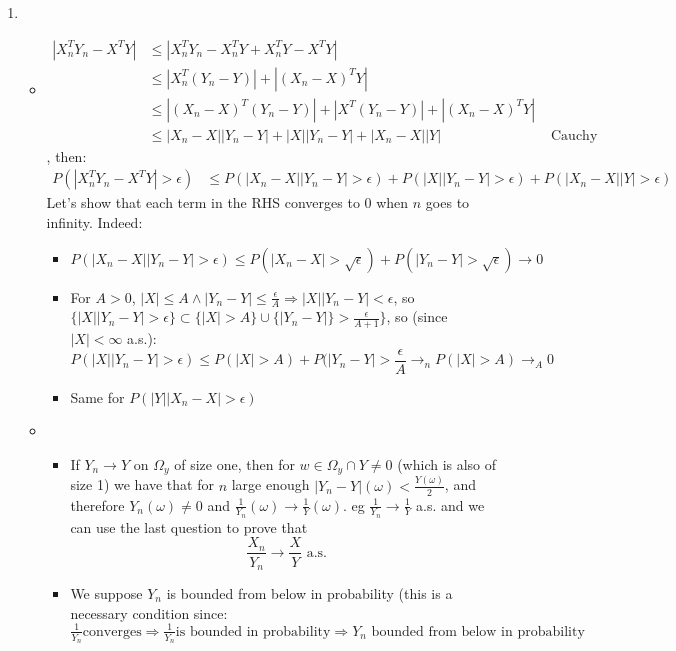 \documentclass[12pt]{article}
\begin{document}
\begin{enumerate}
  \item
    \begin{itemize}
    \item
    \begin{align*}|X_n^TY_n - X^TY| &\le |X_n^TY_n - X_n^TY + X_n^TY -
      X^TY| \\&\le |X_n^T(Y_n - Y)| + |(X_n-X)^TY| \\&\le
      |(X_n-X)^T(Y_n - Y)| + |X^T(Y_n-Y)| + |(X_n-X)^TY| \\&\le
      |X_n-X| |Y_n - Y| + |X| |Y_n-Y| + |X_n-X| |Y| &\text{ Cauchy
        Shwartz}
    \end{align*}
    , then:
    \begin{align*}
      P(|X_n^TY_n - X^TY| > \epsilon)
      &\le P(|X_n-X| |Y_n - Y|  > \epsilon) + P(|X| |Y_n-Y| > \epsilon) + P(|X_n-X| |Y| > \epsilon)
    \end{align*}
    Let's show that each term in the RHS converges to 0 when $n$ goes
    to infinity. Indeed:
    \begin{itemize}
    \item
      $P(|X_n-X| |Y_n - Y| > \epsilon)\le P(|X_n - X| >
      \sqrt{\epsilon}) + P(|Y_n - Y| > \sqrt{\epsilon}) \rightarrow 0$
    \item For $A > 0$,
      $|X| \le A \wedge |Y_n-Y| \le \frac{\epsilon}{A} \Rightarrow |X|
      |Y_n - Y| < \epsilon$,
      so
      $\{|X| |Y_n - Y| > \epsilon \} \subset \{|X|>A\} \cup \{|Y_n-Y|
      \} > \frac{\epsilon}{A+1}\}$, so (since $|X| < \infty$ a.s.):
    $$P(|X| |Y_n-Y| > \epsilon) \le P(|X| > A) + P(|Y_n - Y| > \frac{\epsilon}{A} \rightarrow_n P(|X| > A) \rightarrow_A 0$$
  \item Same for $P(|Y| |X_n-X| > \epsilon)$
  \end{itemize}
  
\item
  \begin{itemize}
  \item If $Y_n \rightarrow Y$ on $\Omega_y$ of size one, then for
    $w \in \Omega_y \cap {Y \ne 0}$ (which is also of size 1) we have
    that for $n$ large enough $|Y_n - Y|(\omega) < \frac{Y(\omega)}2$,
    and therefore $Y_n(\omega) \ne 0$ and
    $\frac1{Y_n}(\omega) \rightarrow \frac1 Y(\omega)$. eg
    $\frac1 {Y_n} \rightarrow \frac1 Y$ a.s. and we can use the last
    question to prove that
  $$\frac{X_n}{Y_n} \rightarrow \frac{X}{Y} \text{ a.s.} $$

\item
  We suppose $Y_n$ is bounded from below in probability (this is a necessary condition since: $\frac1 {Y_n} \text{converges} \Rightarrow \frac 1 {Y_n} \text{is bounded in probability} \Rightarrow Y_n \text{ bounded from below in probability}$


\end{itemize}
\end{itemize}
\end{enumerate}
\end{document}
